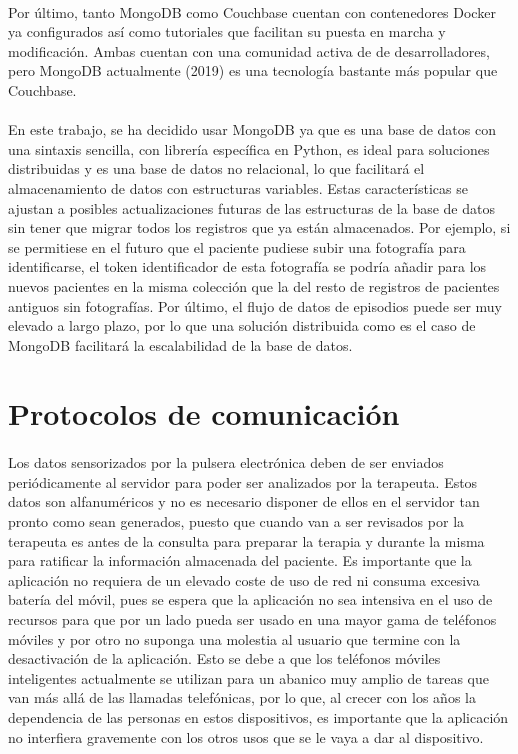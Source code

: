 \begin{itemize}
\paragraph{}
Por último, tanto MongoDB como Couchbase cuentan con contenedores Docker ya configurados así como tutoriales que facilitan su puesta en marcha y modificación. Ambas cuentan con una comunidad activa de de desarrolladores, pero MongoDB actualmente (2019) es una tecnología bastante más popular que Couchbase.
\end{itemize}

\paragraph{}
En este trabajo, se ha decidido usar MongoDB ya que es una base de datos con una sintaxis sencilla, con librería específica en Python, es ideal para soluciones distribuidas y es una base de datos no relacional, lo que facilitará el almacenamiento de datos con estructuras variables. Estas características se ajustan a posibles actualizaciones futuras de las estructuras de la base de datos sin tener que migrar todos los registros que ya están almacenados. Por ejemplo, si se permitiese en el futuro que el paciente pudiese subir una fotografía para identificarse, el token identificador de esta fotografía se podría añadir para los nuevos pacientes en la misma colección que la del resto de registros de pacientes antiguos sin fotografías. Por último, el flujo de datos de episodios puede ser muy elevado a largo plazo, por lo que una solución distribuida como es el caso de MongoDB facilitará la escalabilidad de la base de datos.

\section{Protocolos de comunicación}
\label{sec:protoCom}
\paragraph{}
Los datos sensorizados por la pulsera electrónica deben de ser enviados periódicamente al servidor para poder ser analizados por la terapeuta. Estos datos son alfanuméricos y no es necesario disponer de ellos en el servidor tan pronto como sean generados, puesto que cuando van a ser revisados por la terapeuta es antes de la consulta para preparar la terapia y durante la misma para ratificar la información almacenada del paciente. Es importante que la aplicación no requiera de un elevado coste de uso de red ni consuma excesiva batería del móvil, pues se espera que la aplicación no sea intensiva en el uso de recursos para que por un lado pueda ser usado en una mayor gama de teléfonos móviles y por otro no suponga una molestia al usuario que termine con la desactivación de la aplicación. Esto se debe a que los teléfonos móviles inteligentes actualmente se utilizan para un abanico muy amplio de tareas que van más allá de las llamadas telefónicas, por lo que, al crecer con los años la dependencia de las personas en estos dispositivos, es importante que la aplicación no interfiera gravemente con los otros usos que se le vaya a dar al dispositivo.

